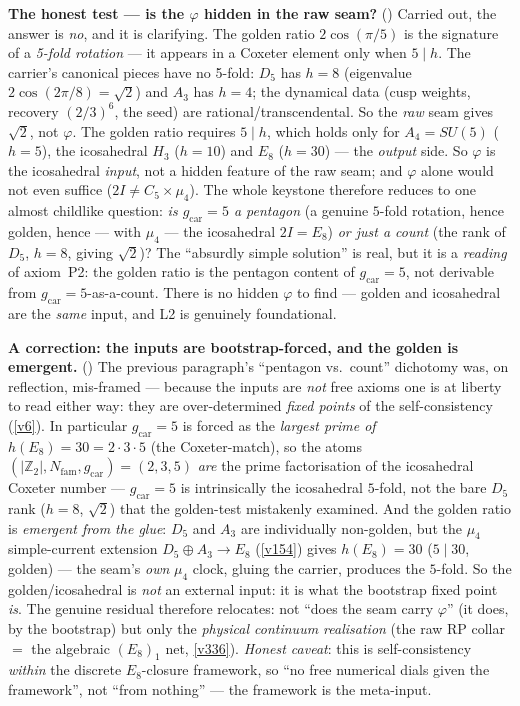 \documentclass[11pt,a4paper]{article}
\newcommand{\gcar}{g_{\mathrm{car}}}
\newcommand{\Nfam}{N_{\mathrm{fam}}}
\newcommand{\Z}{\mathbb Z}
\begin{document}
\par\smallskip\noindent\textbf{The honest test --- is the $\varphi$ hidden in the raw seam?} ()
Carried out, the answer is \emph{no}, and it is clarifying. The golden ratio $2\cos(\pi/5)$ is the signature of a
\emph{5-fold rotation} --- it appears in a Coxeter element only when $5\mid h$. The carrier's canonical pieces have
no 5-fold: $D_5$ has $h{=}8$ (eigenvalue $2\cos(2\pi/8)=\sqrt2$) and $A_3$ has $h{=}4$; the dynamical data (cusp
weights, recovery $(2/3)^6$, the seed) are rational/transcendental. So the \emph{raw} seam gives $\sqrt2$, not
$\varphi$. The golden ratio requires $5\mid h$, which holds only for $A_4{=}SU(5)$ ($h{=}5$), the icosahedral $H_3$
($h{=}10$) and $E_8$ ($h{=}30$) --- the \emph{output} side. So $\varphi$ is the icosahedral \emph{input}, not a
hidden feature of the raw seam; and $\varphi$ alone would not even suffice ($2I\neq C_5\times\mu_4$). The whole
keystone therefore reduces to one almost childlike question: \emph{is $\gcar{=}5$ a pentagon} (a genuine $5$-fold
rotation, hence golden, hence --- with $\mu_4$ --- the icosahedral $2I=E_8$) \emph{or just a count} (the rank of
$D_5$, $h{=}8$, giving $\sqrt2$)? The ``absurdly simple solution'' is real, but it is a \emph{reading} of axiom~P2:
the golden ratio is the pentagon content of $\gcar{=}5$, not derivable from $\gcar{=}5$-as-a-count. There is no
hidden $\varphi$ to find --- golden and icosahedral are the \emph{same} input, and L2 is genuinely foundational.

\par\smallskip\noindent\textbf{A correction: the inputs are bootstrap-forced, and the golden is emergent.}
()
The previous paragraph's ``pentagon vs.\ count'' dichotomy was, on reflection, mis-framed --- because the inputs
are \emph{not} free axioms one is at liberty to read either way: they are over-determined \emph{fixed points} of the
self-consistency (\vref{v6}).  In particular $\gcar{=}5$ is forced as the \emph{largest prime of} $h(E_8)=30=2{\cdot}3{\cdot}5$
(the Coxeter-match), so the atoms $(|\Z_2|,\Nfam,\gcar)=(2,3,5)$ \emph{are} the prime factorisation of the
icosahedral Coxeter number --- $\gcar{=}5$ is intrinsically the icosahedral $5$-fold, not the bare $D_5$ rank
($h{=}8$, $\sqrt2$) that the golden-test mistakenly examined. And the golden ratio is \emph{emergent from the glue}:
$D_5$ and $A_3$ are individually non-golden, but the $\mu_4$ simple-current extension $D_5\!\oplus\!A_3\to E_8$
(\vref{v154}) gives $h(E_8)=30$ ($5\mid30$, golden) --- the seam's \emph{own} $\mu_4$ clock, gluing the carrier,
produces the $5$-fold.  So the golden/icosahedral is \emph{not} an external input: it is what the bootstrap fixed
point \emph{is}.  The genuine residual therefore relocates: not ``does the seam carry $\varphi$'' (it does, by the
bootstrap) but only the \emph{physical continuum realisation} (the raw RP collar $=$ the algebraic $(E_8)_1$ net,
\vref{v336}).  \emph{Honest caveat}: this is self-consistency \emph{within} the discrete $E_8$-closure framework, so
``no free numerical dials given the framework'', not ``from nothing'' --- the framework is the meta-input.
\end{document}
